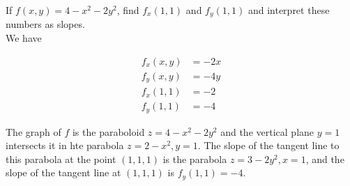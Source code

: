         \textit{} If $f(x,y) = 4 - x^2 - 2y^2$, find $f_x (1,1)$ and $f_y (1,1)$ and interpret these numbers as slopes. \\

        We have

        \begin{align*}
            f_x (x,y) &= -2x \\
            f_y (x,y) &= -4y \\
            f_x (1,1) &= -2 \\
            f_y (1,1) &= -4
        \end{align*}

        The graph of $f$ is the paraboloid $z=4-x^2 - 2y^2$ and the vertical plane $y=1$ intersects it in hte parabola $z=2-x^2, y=1$. The slope of the tangent line to this parabola at the point $(1,1,1)$ is the parabola
        $z=3-2y^2,x=1$, and the slope of the tangent line at $(1,1,1)$ is $f_y (1,1) = -4$.


